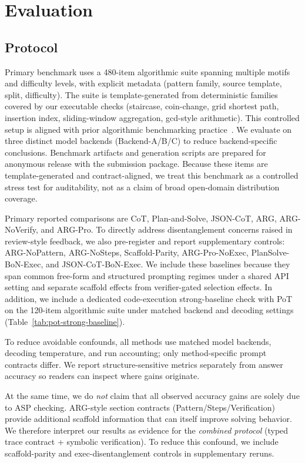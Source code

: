 \documentclass{article}
\begin{document}
\section{Evaluation}
\subsection{Protocol}
Primary benchmark uses a 480-item algorithmic suite spanning multiple motifs and difficulty levels, with explicit metadata (pattern family, source template, split, difficulty). The suite is template-generated from deterministic families covered by our executable checks (staircase, coin-change, grid shortest path, insertion index, sliding-window aggregation, gcd-style arithmetic). This controlled setup is aligned with prior algorithmic benchmarking practice~\cite{velivckovic2022clrs}. We evaluate on three distinct model backends (Backend-A/B/C) to reduce backend-specific conclusions. Benchmark artifacts and generation scripts are prepared for anonymous release with the submission package.
Because these items are template-generated and contract-aligned, we treat this benchmark as a controlled stress test for auditability, not as a claim of broad open-domain distribution coverage.

Primary reported comparisons are CoT, Plan-and-Solve, JSON-CoT, ARG, ARG-NoVerify, and ARG-Pro. To directly address disentanglement concerns raised in review-style feedback, we also pre-register and report supplementary controls: ARG-NoPattern, ARG-NoSteps, Scaffold-Parity, ARG-Pro-NoExec, PlanSolve-BoN-Exec, and JSON-CoT-BoN-Exec. We include these baselines because they span common free-form and structured prompting regimes under a shared API setting and separate scaffold effects from verifier-gated selection effects.
In addition, we include a dedicated code-execution strong-baseline check with PoT on the 120-item algorithmic suite under matched backend and decoding settings (Table~\ref{tab:pot-strong-baseline}).

To reduce avoidable confounds, all methods use matched model backends, decoding temperature, and run accounting; only method-specific prompt contracts differ. We report structure-sensitive metrics separately from answer accuracy so readers can inspect where gains originate.

At the same time, we do \emph{not} claim that all observed accuracy gains are solely due to ASP checking. ARG-style section contracts (Pattern/Steps/Verification) provide additional scaffold information that can itself improve solving behavior. We therefore interpret our results as evidence for the \emph{combined protocol} (typed trace contract + symbolic verification). To reduce this confound, we include scaffold-parity and exec-disentanglement controls in supplementary reruns.
\end{document}
